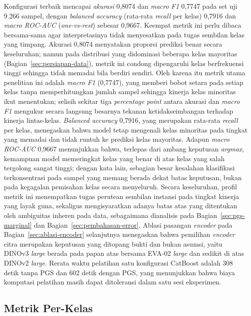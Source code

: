 Konfigurasi terbaik mencapai \textit{akurasi} 0,8074 dan \textit{macro F1} 0,7747 pada set uji 9.266 sampel, dengan \textit{balanced accuracy} (rata-rata \textit{recall} per kelas) 0,7916 dan \textit{macro ROC-AUC} (\textit{one-vs-rest}) sebesar 0,9667. Keempat metrik ini perlu dibaca bersama-sama agar interpretasinya tidak menyesatkan pada tugas sembilan kelas yang timpang. Akurasi 0,8074 menyatakan proporsi prediksi benar secara keseluruhan; namun pada distribusi yang didominasi beberapa kelas mayoritas (Bagian~\ref{sec:persiapan-data}), metrik ini condong dipengaruhi kelas berfrekuensi tinggi sehingga tidak memadai bila berdiri sendiri. Oleh karena itu metrik utama penelitian ini adalah \textit{macro F1} (0,7747), yang memberi bobot setara pada setiap kelas tanpa memperhitungkan jumlah sampel sehingga kinerja kelas minoritas ikut menentukan; selisih sekitar tiga \textit{percentage point} antara akurasi dan \textit{macro F1} mengukur secara langsung besarnya tekanan ketidakseimbangan terhadap kinerja lintas-kelas. \textit{Balanced accuracy} 0,7916, yang merupakan rata-rata \textit{recall} per kelas, menegaskan bahwa model tetap mengenali kelas minoritas pada tingkat yang memadai dan tidak runtuh ke prediksi kelas mayoritas. Adapun \textit{macro ROC-AUC} 0,9667 menunjukkan bahwa, terlepas dari ambang keputusan \textit{argmax}, kemampuan model memeringkat kelas yang benar di atas kelas yang salah tergolong sangat tinggi; dengan kata lain, sebagian besar kesalahan klasifikasi terkonsentrasi pada sampel yang memang berada dekat batas keputusan, bukan pada kegagalan pemisahan kelas secara menyeluruh. Secara keseluruhan, profil metrik ini menempatkan tugas perutean sembilan instansi pada tingkat kinerja yang layak guna, sekaligus mengisyaratkan adanya batas atas yang ditentukan oleh ambiguitas inheren pada data, sebagaimana dianalisis pada Bagian~\ref{sec:pgs-marginal} dan Bagian~\ref{sec:pembahasan-error}. Ablasi pasangan \textit{encoder} pada Bagian~\ref{sec:ablasi-encoder} selanjutnya menegaskan bahwa pemilihan \textit{encoder} citra merupakan keputusan yang ditopang bukti dan bukan asumsi, yaitu DINOv3 \textit{large} berada pada papan atas bersama EVA-02 \textit{large} dan sedikit di atas DINOv2 \textit{large}. Rerata waktu pelatihan satu konfigurasi CatBoost adalah 308 detik tanpa PGS dan 602 detik dengan PGS, yang menunjukkan bahwa biaya komputasi pelatihan masih dapat ditoleransi dalam satu sesi eksperimen.

\subsection{Metrik Per-Kelas}
\label{sec:metrik-per-kelas}

